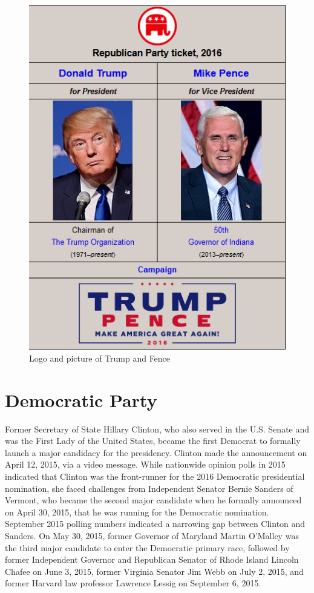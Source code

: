 \begin{figure}[!h]
	\begin{center}
		\includegraphics[width=0.6\linewidth]{images/trump}
		\caption{Logo and picture of Trump and Fence}
	\end{center}
\end{figure}

\newpage


\section{Democratic Party}

Former Secretary of State Hillary Clinton, who also served in the U.S. Senate and was the First Lady of the United States, became the first Democrat to formally launch a major candidacy for the presidency. Clinton made the announcement on April 12, 2015, via a video message. While nationwide opinion polls in 2015 indicated that Clinton was the front-runner for the 2016 Democratic presidential nomination, she faced challenges from Independent Senator Bernie Sanders of Vermont, who became the second major candidate when he formally announced on April 30, 2015, that he was running for the Democratic nomination. September 2015 polling numbers indicated a narrowing gap between Clinton and Sanders. On May 30, 2015, former Governor of Maryland Martin O'Malley was the third major candidate to enter the Democratic primary race, followed by former Independent Governor and Republican Senator of Rhode Island Lincoln Chafee on June 3, 2015, former Virginia Senator Jim Webb on July 2, 2015, and former Harvard law professor Lawrence Lessig on September 6, 2015.

